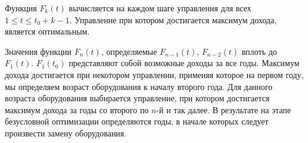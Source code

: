Функция $F_k(t)$ вычисляется на каждом шаге управления для всех $1 \leq t \leq t_0 + k - 1$. Управление при котором достигается максимум дохода, является оптимальным.

Значения функции $F_n(t)$, определяемые $F_{n-1}(t)$, $F_{n-2}(t)$ вплоть до $F_1(t)$. $F_1(t_0)$ представляют собой возможные доходы за все годы. Максимум дохода достигается при некотором управлении, применяя которое на первом году, мы определяем возраст оборудования к началу второго года. Для данного возраста оборудования выбирается управление, при котором достигается максимум дохода за годы со второго по $n$-й и так далее. В результате на этапе безусловной оптимизации определяются годы, в начале которых следует произвести замену оборудования.